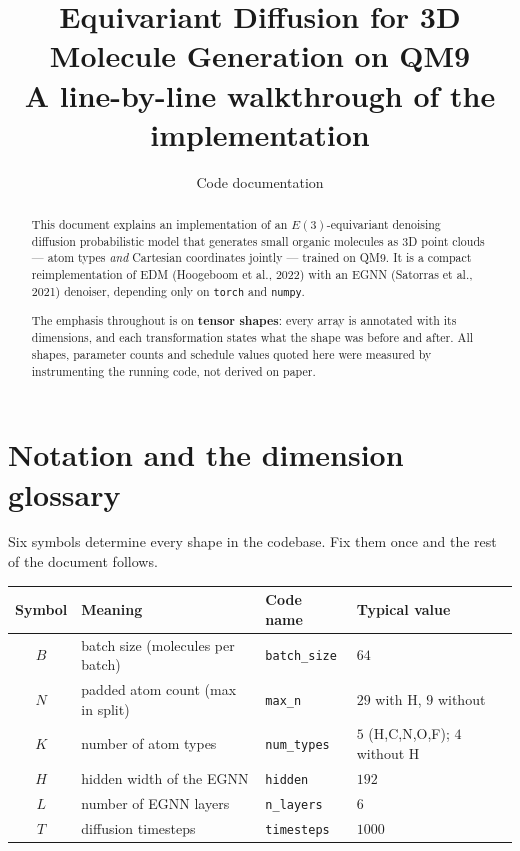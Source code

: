 \documentclass[11pt,a4paper]{article}
\title{\textbf{Equivariant Diffusion for 3D Molecule Generation on QM9}\\[4pt]
\large A line-by-line walkthrough of the implementation}
\author{Code documentation}
\date{}
\newcommand{\code}[1]{\texttt{#1}}
\begin{document}
\maketitle

\begin{abstract}
\noindent
This document explains an implementation of an $E(3)$-equivariant denoising
diffusion probabilistic model that generates small organic molecules as 3D point
clouds --- atom types \emph{and} Cartesian coordinates jointly --- trained on
QM9. It is a compact reimplementation of EDM (Hoogeboom et al., 2022) with an
EGNN (Satorras et al., 2021) denoiser, depending only on \code{torch} and
\code{numpy}.

The emphasis throughout is on \textbf{tensor shapes}: every array is annotated
with its dimensions, and each transformation states what the shape was before
and after. All shapes, parameter counts and schedule values quoted here were
measured by instrumenting the running code, not derived on paper.
\end{abstract}

\tableofcontents

\section{Notation and the dimension glossary}

Six symbols determine every shape in the codebase. Fix them once and the rest
of the document follows.

\begin{center}
\begin{tabular}{@{}clll@{}}
\toprule
\textbf{Symbol} & \textbf{Meaning} & \textbf{Code name} & \textbf{Typical value} \\
\midrule
$B$ & batch size (molecules per batch)   & \code{batch\_size} & $64$ \\
$N$ & padded atom count (max in split)   & \code{max\_n}      & $29$ with H, $9$ without \\
$K$ & number of atom types               & \code{num\_types}  & $5$ (H,C,N,O,F); $4$ without H \\
$H$ & hidden width of the EGNN           & \code{hidden}      & $192$ \\
$L$ & number of EGNN layers              & \code{n\_layers}   & $6$ \\
$T$ & diffusion timesteps                & \code{timesteps}   & $1000$ \\
\bottomrule
\end{tabular}
\end{center}
\end{document}
